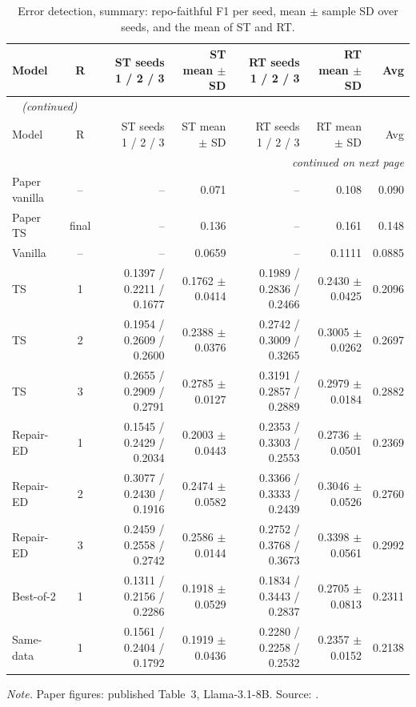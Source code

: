 {\footnotesize
{}
\setlength{\tabcolsep}{4.2pt}
\begin{longtable}{@{}lcrrrrr@{}}
\caption{Error detection, summary: repo-faithful F1 per seed, mean $\pm$ sample SD over seeds, and the mean of ST and RT.}\label{tab:gen-ed-summary}\\
\toprule
\rowcolor{headshade}Model & R & \makecell{ST seeds\\1 / 2 / 3} & ST mean $\pm$ SD & \makecell{RT seeds\\1 / 2 / 3} & RT mean $\pm$ SD & Avg\\
\midrule
\endfirsthead
\multicolumn{7}{l}{\textit{\tablename~\thetable{} (continued)}}\\
\toprule
\rowcolor{headshade}Model & R & \makecell{ST seeds\\1 / 2 / 3} & ST mean $\pm$ SD & \makecell{RT seeds\\1 / 2 / 3} & RT mean $\pm$ SD & Avg\\
\midrule
\endhead
\midrule
\multicolumn{7}{r}{\textit{continued on next page}}\\
\endfoot
\bottomrule
\endlastfoot
Paper vanilla & -- & -- & 0.071 & -- & 0.108 & 0.090\\
Paper TS & final & -- & 0.136 & -- & 0.161 & 0.148\\
\midrule
Vanilla & -- & -- & 0.0659 & -- & 0.1111 & 0.0885\\
\midrule
TS & 1 & 0.1397 / 0.2211 / 0.1677 & 0.1762 $\pm$ 0.0414 & 0.1989 / 0.2836 / 0.2466 & 0.2430 $\pm$ 0.0425 & 0.2096\\
TS & 2 & 0.1954 / 0.2609 / 0.2600 & 0.2388 $\pm$ 0.0376 & 0.2742 / 0.3009 / 0.3265 & 0.3005 $\pm$ 0.0262 & 0.2697\\
TS & 3 & 0.2655 / 0.2909 / 0.2791 & 0.2785 $\pm$ 0.0127 & 0.3191 / 0.2857 / 0.2889 & 0.2979 $\pm$ 0.0184 & 0.2882\\
\midrule
Repair-ED & 1 & 0.1545 / 0.2429 / 0.2034 & 0.2003 $\pm$ 0.0443 & 0.2353 / 0.3303 / 0.2553 & 0.2736 $\pm$ 0.0501 & 0.2369\\
Repair-ED & 2 & 0.3077 / 0.2430 / 0.1916 & 0.2474 $\pm$ 0.0582 & 0.3366 / 0.3333 / 0.2439 & 0.3046 $\pm$ 0.0526 & 0.2760\\
Repair-ED & 3 & 0.2459 / 0.2558 / 0.2742 & 0.2586 $\pm$ 0.0144 & 0.2752 / 0.3768 / 0.3673 & 0.3398 $\pm$ 0.0561 & 0.2992\\
\midrule
Best-of-2 & 1 & 0.1311 / 0.2156 / 0.2286 & 0.1918 $\pm$ 0.0529 & 0.1834 / 0.3443 / 0.2837 & 0.2705 $\pm$ 0.0813 & 0.2311\\
\midrule
Same-data & 1 & 0.1561 / 0.2404 / 0.1792 & 0.1919 $\pm$ 0.0436 & 0.2280 / 0.2258 / 0.2532 & 0.2357 $\pm$ 0.0152 & 0.2138\\
\end{longtable}
}
\vspace{-0.6\baselineskip}
{\footnotesize\color{slate}\textit{Note.} Paper figures: published Table~3, Llama-3.1-8B. Source: .\par}
\medskip
